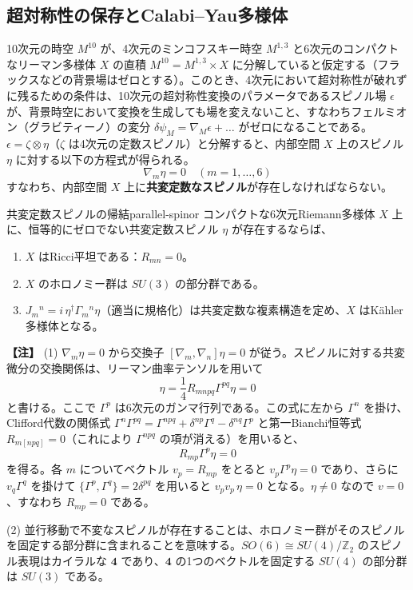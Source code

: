 \documentclass[uplatex, dvipdfmx, book]{jsbook}
\let\origsubsection\subsection
\let\origsubsubsection\subsubsection
\renewcommand{\section}{\origsubsection}
\renewcommand{\subsection}{\origsubsubsection}
\renewcommand{\subsubsection}{\paragraph}
\newenvironment{note}{\vspace{1ex}\par\footnotesize\noindent\textbf{【注】}}{\par\vspace{1ex}}
\begin{document}
\section{超対称性の保存とCalabi--Yau多様体}

10次元の時空 $M^{10}$ が、4次元のミンコフスキー時空 $M^{1,3}$ と6次元のコンパクトなリーマン多様体 $X$ の直積 $M^{10} = M^{1,3} \times X$ に分解していると仮定する（フラックスなどの背景場はゼロとする）。このとき、4次元において超対称性が破れずに残るための条件は、10次元の超対称性変換のパラメータであるスピノル場 $\epsilon$ が、背景時空において変換を生成しても場を変えないこと、すなわちフェルミオン（グラビティーノ）の変分 $\delta \psi_M = \nabla_M \epsilon + \dots$ がゼロになることである。$\epsilon = \zeta \otimes \eta$（$\zeta$ は4次元の定数スピノル）と分解すると、内部空間 $X$ 上のスピノル $\eta$ に対する以下の方程式が得られる。
\begin{equation}
    \nabla_m \eta = 0 \quad (m = 1, \dots, 6)
\end{equation}
すなわち、内部空間 $X$ 上に\textbf{共変定数なスピノル}が存在しなければならない。

\begin{myprop}{共変定数スピノルの帰結}{parallel-spinor}
コンパクトな6次元Riemann多様体 $X$ 上に、恒等的にゼロでない共変定数スピノル $\eta$ が存在するならば、
\begin{enumerate}
    \item $X$ はRicci平坦である：$R_{mn} = 0$。
    \item $X$ のホロノミー群は $SU(3)$ の部分群である。
    \item $J_{m}{}^{n} = i\,\eta^\dagger \Gamma_m{}^n \eta$（適当に規格化）は共変定数な複素構造を定め、$X$ はK\"ahler多様体となる。
\end{enumerate}
\end{myprop}

\begin{note}
(1) $\nabla_m \eta = 0$ から交換子 $[\nabla_m, \nabla_n] \eta = 0$ が従う。スピノルに対する共変微分の交換関係は、リーマン曲率テンソルを用いて
\begin{equation*}
    [\nabla_m, \nabla_n]\eta = \frac{1}{4} R_{mnpq} \Gamma^{pq} \eta = 0
\end{equation*}
と書ける。ここで $\Gamma^p$ は6次元のガンマ行列である。この式に左から $\Gamma^n$ を掛け、Clifford代数の関係式 $\Gamma^n \Gamma^{pq} = \Gamma^{npq} + \delta^{np}\Gamma^q - \delta^{nq}\Gamma^p$ と第一Bianchi恒等式 $R_{m[npq]}=0$（これにより $\Gamma^{npq}$ の項が消える）を用いると、
\begin{equation*}
    R_{mp} \Gamma^p \eta = 0
\end{equation*}
を得る。各 $m$ についてベクトル $v_p = R_{mp}$ をとると $v_p\Gamma^p\eta = 0$ であり、さらに $v_q\Gamma^q$ を掛けて $\{\Gamma^p, \Gamma^q\} = 2\delta^{pq}$ を用いると $v_pv_p\,\eta = 0$ となる。$\eta \neq 0$ なので $v = 0$、すなわち $R_{mp} = 0$ である。

(2) 並行移動で不変なスピノルが存在することは、ホロノミー群がそのスピノルを固定する部分群に含まれることを意味する。$SO(6) \cong SU(4)/\mathbb{Z}_2$ のスピノル表現はカイラルな $\mathbf{4}$ であり、$\mathbf{4}$ の1つのベクトルを固定する $SU(4)$ の部分群は $SU(3)$ である。
\end{note}
\end{document}
